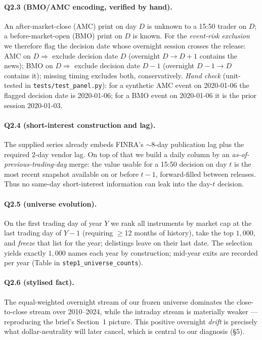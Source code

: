 \documentclass[11pt,a4paper]{article}
\newcommand{\code}[1]{\texttt{#1}}
\begin{document}
\paragraph{Q2.3 (BMO/AMC encoding, verified by hand).} An after-market-close (AMC) print on day $D$ is unknown
to a 15:50 trader on $D$; a before-market-open (BMO) print on $D$ is known. For the \emph{event-risk exclusion}
we therefore flag the decision date whose overnight session crosses the release: AMC on $D\Rightarrow$ exclude
decision date $D$ (overnight $D\!\to\!D{+}1$ contains the news); BMO on $D\Rightarrow$ exclude decision date
$D{-}1$ (overnight $D{-}1\!\to\!D$ contains it); missing timing excludes both, conservatively. \emph{Hand check}
(unit-tested in \code{tests/test\_panel.py}): for a synthetic AMC event on 2020-01-06 the flagged decision date
is 2020-01-06; for a BMO event on 2020-01-06 it is the prior session 2020-01-03.

\paragraph{Q2.4 (short-interest construction and lag).} The supplied series already embeds FINRA's
$\sim$8-day publication lag plus the required 2-day vendor lag. On top of that we build a daily column by an
\emph{as-of-previous-trading-day} merge: the value usable for a 15:50 decision on day $t$ is the most recent
snapshot available on or before $t{-}1$, forward-filled between releases. Thus no same-day short-interest
information can leak into the day-$t$ decision.

\paragraph{Q2.5 (universe evolution).} On the first trading day of year $Y$ we rank all instruments by market
cap at the last trading day of $Y{-}1$ (requiring $\ge$12 months of history), take the top
$1{,}000$, and \emph{freeze} that list for the year; delistings leave on their last date. The selection yields
exactly $1{,}000$ names each year by construction; mid-year exits are recorded per year (Table in
\code{step1\_universe\_counts}).

\paragraph{Q2.6 (stylised fact).} The equal-weighted overnight stream of our frozen universe dominates the
close-to-close stream over 2010--2024, while the intraday stream is materially weaker --- reproducing the
brief's Section~1 picture. This positive overnight \emph{drift} is precisely what dollar-neutrality will later
cancel, which is central to our diagnosis (\S5).
\end{document}
